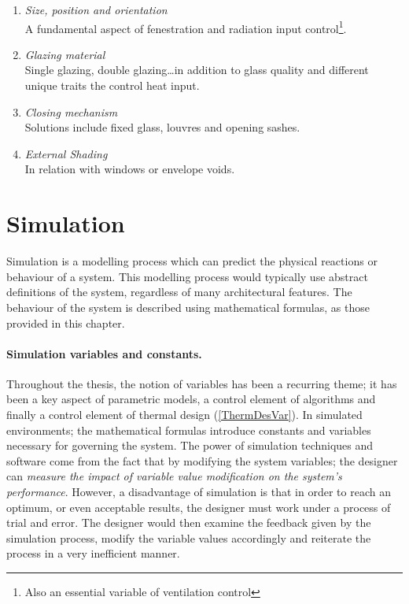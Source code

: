 \begin{enumerate}
  	\begin{enumerate}
  	  \item \emph{Size, position and orientation}\\ A fundamental aspect of fenestration and radiation input control\footnote{Also an essential variable of ventilation control}.
  	  \item \emph{Glazing material}\\ Single glazing, double glazing\ldots in addition to glass quality and different unique traits the control heat input.
  	  \item \emph{Closing mechanism}\\ Solutions include fixed glass, louvres and opening sashes.
  	  \item \emph{External Shading}\\ In relation with windows or envelope voids.
  	\end{enumerate}
\end{enumerate}

\clearpage
\section{Simulation}

Simulation is a modelling process which can predict the physical reactions or behaviour of a system. This modelling process would typically use abstract definitions of the system, regardless of many architectural features. The behaviour of the system is described using mathematical formulas, as those provided in this chapter. \cite{fasoulaki08}

\paragraph{Simulation variables and constants.} Throughout the thesis, the notion of variables has been a recurring theme; it has been a key aspect of parametric models, a control element of algorithms and finally a control element of thermal design (\autoref{ThermDesVar}). In simulated environments; the mathematical formulas introduce constants and variables necessary for governing the system. The power of simulation techniques and software come from the fact that by modifying the system variables; the designer can \emph{measure the impact of variable value modification on the system's performance}. However, a disadvantage of simulation is that in order to reach an optimum, or even acceptable results, the designer must work under a process of trial and error. The designer would then examine the feedback given by the simulation process, modify the variable values accordingly and reiterate the process in a very inefficient manner. \cite{fasoulaki08}

